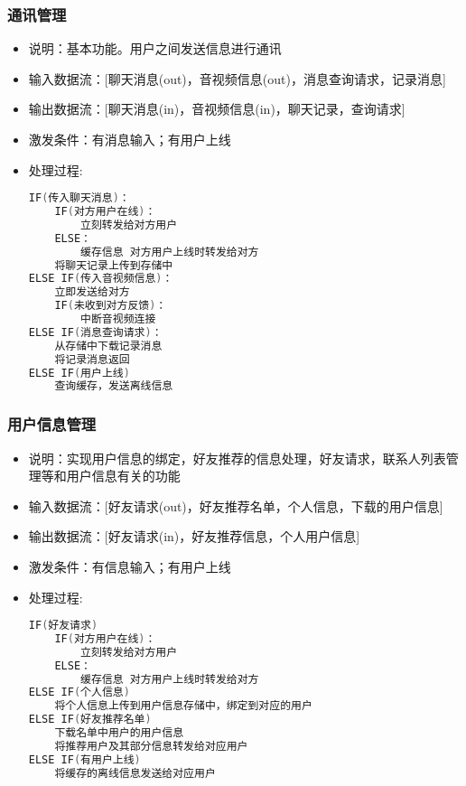             \subsubsection{通讯管理}
            \begin{itemize}
                \item 说明：基本功能。用户之间发送信息进行通讯
                \item 输入数据流：[聊天消息(out)，音视频信息(out)，消息查询请求，记录消息]
                \item 输出数据流：[聊天消息(in)，音视频信息(in)，聊天记录，查询请求]
                \item 激发条件：有消息输入；有用户上线
                \item 处理过程: 
\begin{lstlisting}[language=C, caption=通讯管理, label={code:first-code}]
IF(传入聊天消息)：
    IF(对方用户在线)：
        立刻转发给对方用户
    ELSE：
        缓存信息 对方用户上线时转发给对方
    将聊天记录上传到存储中
ELSE IF(传入音视频信息)：
    立即发送给对方
    IF(未收到对方反馈)：
        中断音视频连接
ELSE IF(消息查询请求)：
    从存储中下载记录消息
    将记录消息返回
ELSE IF(用户上线)
    查询缓存，发送离线信息
\end{lstlisting}
            \end{itemize}
            \subsubsection{用户信息管理}
            \begin{itemize}
                \item 说明：实现用户信息的绑定，好友推荐的信息处理，好友请求，联系人列表管理等和用户信息有关的功能
                \item 输入数据流：[好友请求(out)，好友推荐名单，个人信息，下载的用户信息]
                \item 输出数据流：[好友请求(in)，好友推荐信息，个人用户信息]
                \item 激发条件：有信息输入；有用户上线
                \item 处理过程: 
\begin{lstlisting}[language=C, caption=用户信息管理, label={code:first-code}]
IF(好友请求)
    IF(对方用户在线)：
        立刻转发给对方用户
    ELSE：
        缓存信息 对方用户上线时转发给对方
ELSE IF(个人信息)
    将个人信息上传到用户信息存储中，绑定到对应的用户
ELSE IF(好友推荐名单)
    下载名单中用户的用户信息
    将推荐用户及其部分信息转发给对应用户
ELSE IF(有用户上线)
    将缓存的离线信息发送给对应用户
\end{lstlisting}
             \end{itemize}
